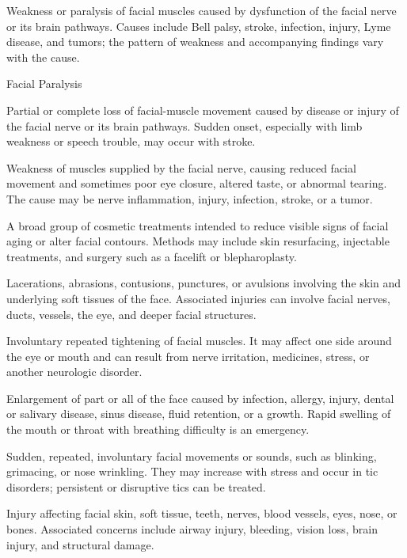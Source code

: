  Weakness or paralysis of facial muscles caused by dysfunction of the facial nerve or its brain pathways. Causes include Bell palsy, stroke, infection, injury, Lyme disease, and tumors; the pattern of weakness and accompanying findings vary with the cause.

\synonyms
Facial Paralysis

 Partial or complete loss of facial-muscle movement caused by disease or injury of the facial nerve or its brain pathways. Sudden onset, especially with limb weakness or speech trouble, may occur with stroke.

 Weakness of muscles supplied by the facial nerve, causing reduced facial movement and sometimes poor eye closure, altered taste, or abnormal tearing. The cause may be nerve inflammation, injury, infection, stroke, or a tumor.

 A broad group of cosmetic treatments intended to reduce visible signs of facial aging or alter facial contours. Methods may include skin resurfacing, injectable treatments, and surgery such as a facelift or blepharoplasty.

 Lacerations, abrasions, contusions, punctures, or avulsions involving the skin and underlying soft tissues of the face. Associated injuries can involve facial nerves, ducts, vessels, the eye, and deeper facial structures.

 Involuntary repeated tightening of facial muscles. It may affect one side around the eye or mouth and can result from nerve irritation, medicines, stress, or another neurologic disorder.

 Enlargement of part or all of the face caused by infection, allergy, injury, dental or salivary disease, sinus disease, fluid retention, or a growth. Rapid swelling of the mouth or throat with breathing difficulty is an emergency.

 Sudden, repeated, involuntary facial movements or sounds, such as blinking, grimacing, or nose wrinkling. They may increase with stress and occur in tic disorders; persistent or disruptive tics can be treated.

 Injury affecting facial skin, soft tissue, teeth, nerves, blood vessels, eyes, nose, or bones. Associated concerns include airway injury, bleeding, vision loss, brain injury, and structural damage.

